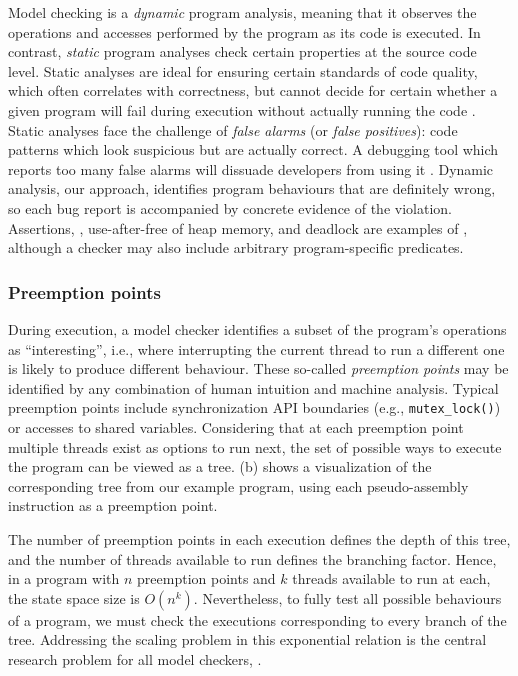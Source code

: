 Model checking is a {\em dynamic} program analysis, meaning that it observes the operations and accesses performed by the program as its code is executed.
In contrast, {\em static} program analyses check certain properties at the source code level.
Static analyses are ideal for ensuring certain standards of code quality, which often correlates with correctness,
but cannot decide for certain whether a given program will fail during execution without actually running the code \cite{incompleteness}.
Static analyses face the challenge of {\em false alarms} (or {\em false positives}):
code patterns which look suspicious but are actually correct.
A debugging tool which reports too many false alarms will dissuade developers from using it \cite{racerx}.
Dynamic analysis, our approach, identifies program behaviours that are definitely wrong,
so each bug report is accompanied by concrete evidence of the violation.
Assertions, , use-after-free of heap memory,
and deadlock are examples of ,
although a checker may also include arbitrary program-specific predicates.

\subsubsection{Preemption points}

During execution, a model checker identifies a subset of the program's operations as ``interesting'', i.e.,
where interrupting the current thread to run a different one is likely to produce different behaviour.
These so-called {\em preemption points} may be identified by any combination of human intuition and machine analysis.
Typical preemption points include synchronization API boundaries (e.g., {\tt mutex\_lock()})
or accesses to shared variables.
Considering that at each preemption point multiple threads exist as options to run next,
the set of possible ways to execute the program can be viewed as a tree.
(b) shows a visualization of the corresponding tree from our example program,
using each pseudo-assembly instruction as a preemption point.

The number of preemption points in each execution defines the depth of this tree,
and the number of threads available to run defines the branching factor.
Hence, in a program with $n$ preemption points and $k$ threads available to run at each, the state space size is $O(n^k)$.
Nevertheless, to fully test all possible behaviours of a program, we must check the executions corresponding to every branch of the tree.
Addressing the scaling problem in this exponential relation is the central research problem for all model checkers,
.


